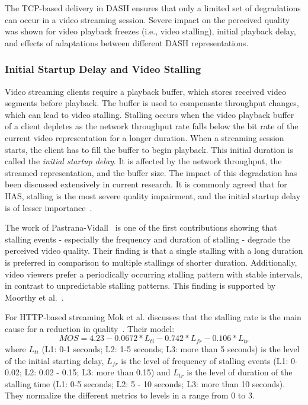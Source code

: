 The \ac{TCP}-based delivery in \ac{DASH} ensures that only a limited set of degradations can occur in a video streaming session.
Severe impact on the perceived quality was shown for video playback freezes (i.e., video \ac{stalling}),  initial playback delay, and effects of adaptations between different \ac{DASH} representations.
\subsubsection{Initial Startup Delay and Video Stalling}
\label{sec:250_stalling_video}
Video streaming clients require a playback buffer, which stores received video segments before playback. 
The buffer is used to compensate throughput changes, which can lead to video \ac{stalling}.
Stalling occurs when the video playback buffer of a client depletes as the network throughput rate falls below the bit rate of the current video representation for a longer duration.
When a streaming session starts, the client has to fill the buffer to begin playback.
This initial duration is called the \emph{initial startup delay}.
It is affected by the network throughput, the streamed representation, and the buffer size.
The impact of this degradation has been discussed extensively in current research. 
It is commonly agreed that for \ac{HAS}, \ac{stalling} is the most severe quality impairment, and the initial startup delay is of lesser importance~\cite{Hossfeld2011,Mok2011,Seufert2015}.

The work of Pastrana-Vidall~\cite{PastranaVidal2004} is one of the first contributions showing that \ac{stalling} events - especially the frequency and duration of \ac{stalling} - degrade the perceived video quality.
Their finding is that a single \ac{stalling} with a long duration is preferred in comparison to multiple \acp{stalling} of shorter duration.
Additionally, video viewers prefer a periodically occurring \ac{stalling} pattern with stable intervals, in contrast to unpredictable \ac{stalling} patterns.
This finding is supported by Moorthy et al.~\cite{Moorthy2012}.

For HTTP-based streaming Mok et al. discusses that the \ac{stalling} rate is the main cause for a reduction in quality~\cite{Mok2011}. 
Their model:
\begin{equation}
MOS = 4.23 - 0.0672 * L_{ti} - 0.742 * L_{fr} - 0.106 * L_{tr} 
\end{equation}
where $L_{ti} $ (L1: 0-1 seconds; L2: 1-5 seconds; L3: more than 5 seconds) is the level of the initial starting delay, $L_{fr}$ is the level of frequency of stalling events (L1: 0-0.02; L2: 0.02 - 0.15; L3: more than 0.15) and $L_{tr} $ is the level of duration of the stalling time (L1: 0-5 seconds; L2: 5 - 10 seconds; L3: more than 10 seconds).
They normalize the different metrics to levels in a range from 0 to 3.

